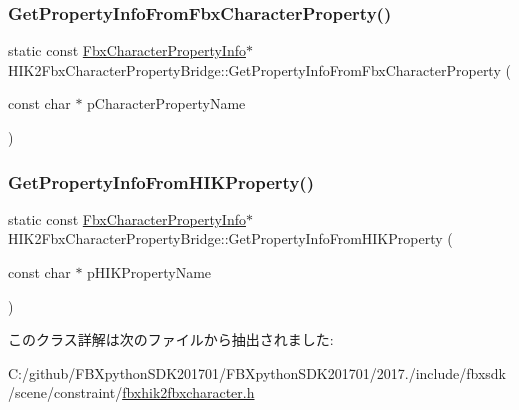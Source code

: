 \subsubsection{\texorpdfstring{Get\+Property\+Info\+From\+Fbx\+Character\+Property()}{GetPropertyInfoFromFbxCharacterProperty()}}
{\footnotesize\ttfamily static const \hyperlink{class_fbx_character_property_info}{Fbx\+Character\+Property\+Info}$\ast$ H\+I\+K2\+Fbx\+Character\+Property\+Bridge\+::\+Get\+Property\+Info\+From\+Fbx\+Character\+Property (\begin{DoxyParamCaption}\item[{const char $\ast$}]{p\+Character\+Property\+Name }\end{DoxyParamCaption})\hspace{0.3cm}{\ttfamily [static]}}

\mbox{\label{class_h_i_k2_fbx_character_property_bridge_af240d0acf8c1577508d186132ef6011f}} 
\subsubsection{\texorpdfstring{Get\+Property\+Info\+From\+H\+I\+K\+Property()}{GetPropertyInfoFromHIKProperty()}}
{\footnotesize\ttfamily static const \hyperlink{class_fbx_character_property_info}{Fbx\+Character\+Property\+Info}$\ast$ H\+I\+K2\+Fbx\+Character\+Property\+Bridge\+::\+Get\+Property\+Info\+From\+H\+I\+K\+Property (\begin{DoxyParamCaption}\item[{const char $\ast$}]{p\+H\+I\+K\+Property\+Name }\end{DoxyParamCaption})\hspace{0.3cm}{\ttfamily [static]}}



このクラス詳解は次のファイルから抽出されました\+:\begin{DoxyCompactItemize}
\item 
C\+:/github/\+F\+B\+Xpython\+S\+D\+K201701/\+F\+B\+Xpython\+S\+D\+K201701/2017./include/fbxsdk/scene/constraint/\hyperlink{fbxhik2fbxcharacter_8h}{fbxhik2fbxcharacter.\+h}\end{DoxyCompactItemize}
